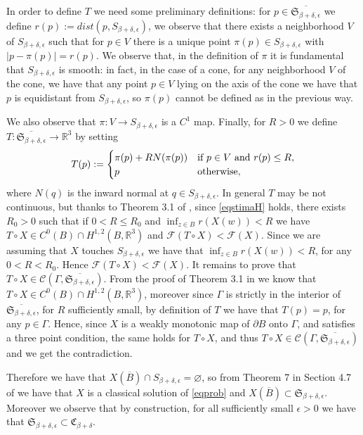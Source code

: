 \documentclass[a4paper,reqno,10pt,oneside]{amsart}
\numberwithin{equation}{section}
\begin{document}
In order to define $T$ we need some preliminary definitions: for $p \in \overline{\mathfrak{S}_{\beta + \delta,\epsilon}} $ we define $r(p):=dist(p,{S}_{\beta + \delta,\epsilon})$, we observe that there exists a neighborhood $V$ of ${S}_{\beta + \delta,\epsilon}$ such that for $p \in V$ there is a unique point $\pi(p) \in {S}_{\beta + \delta,\epsilon}$ with $|p-\pi(p)|=r(p)$. We observe that, in the definition of $\pi$ it is fundamental that ${S}_{\beta + \delta,\epsilon}$ is smooth: in fact, in the case of a cone, for any neighborhood $V$ of the cone, we have that any point $p \in V$ lying on the axis of the cone we have that $p$ is equidistant from ${S}_{\beta + \delta,\epsilon}$, so $\pi(p)$ cannot be defined as in the previous way. 

We also observe that $\pi:V \to {S}_{\beta + \delta,\epsilon}$ is a $C^1$ map. Finally, for $R>0$ we define $T\colon\overline{\mathfrak{S}_{\beta + \delta,\epsilon}} \to {\mathbb R}^3$ by setting $$T(p):= \begin{cases} \pi(p) + R N(\pi(p)) & \hbox{if} \ p \in V \ \hbox{and} \ r(p)\leq R,\\ p & \hbox{otherwise},\end{cases}$$ where $N(q)$ is the inward normal at $q \in {S}_{\beta + \delta,\epsilon} $. In general $T$ may be not continuous, but thanks to Theorem 3.1 of \cite{GulliverSpruck2}, since \eqref{eqstimaH} holds,  there exists $R_0 >0$ such that if $0<R\leq R_0$ and $\inf_{z \in B} r(X(w))< R$ we have $T \circ X \in C^0(B) \cap H^{1,2}(B,{\mathbb R}^3)$ and $\mathcal{F}(T\circ X)<\mathcal{F}(X)$. Since we are assuming that $X$ touches $S_{\beta + \delta,\epsilon}$ we have that $\inf_{z \in B} r(X(w))< R$, for any $0<R<R_0$. Hence $\mathcal{F}(T\circ X)<\mathcal{F}(X)$. It remains to prove that $T\circ X \in \mathcal{C}(\Gamma, \overline{\mathfrak{S}_{\beta + \delta,\epsilon}})$. From the proof of Theorem 3.1 in \cite{GulliverSpruck2} we know that $T \circ X \in C^0(B) \cap H^{1,2}(B,{\mathbb R}^3)$, moreover since $\Gamma$ is strictly in the interior of $ \overline{\mathfrak{S}_{\beta + \delta,\epsilon}}$, for $R$ sufficiently small, by definition of $T$ we have that $T(p)=p$, for any $p \in \Gamma$. Hence, since $X$ is a weakly monotonic map of $\partial B$ onto $\Gamma$, and satisfies a three point condition, the same holds for $T\circ X$, and thus $T\circ X \in \mathcal{C}(\Gamma, \overline{\mathfrak{S}_{\beta + \delta,\epsilon}})$ and we get the contradiction.

Therefore we have that $X(\overline B) \cap S_{\beta + \delta,\epsilon} = \varnothing$, so from Theorem 7 in Section 4.7 of \cite{RegMinSurf} we have that $X$ is a classical solution of \eqref{eqprob} and $X(\overline B) \subset \mathfrak{S}_{\beta+\delta, {\epsilon}}$. Moreover we observe that by construction, for all sufficiently small ${\epsilon}>0$ we have that ${\mathfrak{S}_{\beta + \delta,\epsilon}} \subset {\mathfrak{C}_{\beta + \delta}}$. 
\end{document}
